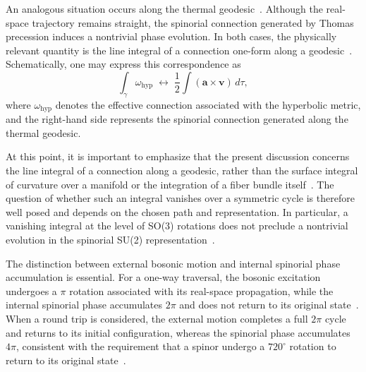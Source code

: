 \documentclass[%
 reprint,
 amsmath,amssymb,
 aps,
 prb,
]{revtex4-2}
\numberwithin{equation}{section}
\begin{document}
An analogous situation occurs along the thermal geodesic~\cite{hanamura17765017}. Although the real-space trajectory remains straight, the spinorial connection generated by Thomas precession induces a nontrivial phase evolution. In both cases, the physically relevant quantity is the line integral of a connection one-form along a geodesic~\cite{nakahara2003,aharonov1959}. Schematically, one may express this correspondence as
\begin{equation}
\int_{\gamma} \omega_{\mathrm{hyp}}
\;\longleftrightarrow\;
\frac{1}{2}\int (\mathbf{a}\times\mathbf{v})\, d\tau ,
\label{eq:correspondence}
\end{equation}
where $\omega_{\mathrm{hyp}}$ denotes the effective connection associated with the hyperbolic metric, and the right-hand side represents the spinorial connection generated along the thermal geodesic.



At this point, it is important to emphasize that the present discussion concerns the line integral of a connection along a geodesic, rather than the surface integral of curvature over a manifold or the integration of a fiber bundle itself~\cite{nakahara2003}. 
The question of whether such an integral vanishes over a symmetric cycle is therefore well posed and depends on the chosen path and representation. 
In particular, a vanishing integral at the level of SO(3) rotations does not preclude a nontrivial evolution in the spinorial SU(2) representation~\cite{wigner1939,sakurai2017}.

The distinction between external bosonic motion and internal spinorial phase accumulation is essential. For a one-way traversal, the bosonic excitation undergoes a $\pi$ rotation associated with its real-space propagation, while the internal spinorial phase accumulates $2\pi$ and does not return to its original state~\cite{ballentine1998,shankar2016}. When a round trip is considered, the external motion completes a full $2\pi$ cycle and returns to its initial configuration, whereas the spinorial phase accumulates $4\pi$, consistent with the requirement that a spinor undergo a $720^\circ$ rotation to return to its original state~\cite{sakurai2017,dirac1928}.
\end{document}
